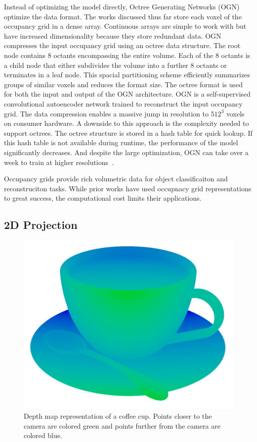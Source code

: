 Instead of optimizing the model directly, Octree Generating Networks (OGN)~\cite{Tatarchenko2017} optimize the data format. The works discussed thus far store each voxel of the occupancy grid in a dense array. Continuous arrays are simple to work with but have increased dimensionality because they store redundant data. OGN compresses the input occupancy grid using an octree data structure. The root node contains 8 octants encompassing the entire volume. Each of the 8 octants is a child node that either subdivides the volume into a further 8 octants or terminates in a leaf node. This spacial partitioning scheme efficiently summarizes groups of similar voxels and reduces the format size. The octree format is used for both the input and output of the OGN architecture. OGN is a self-supervised convolutional autoencoder network trained to reconstruct the input occupancy grid. The data compression enables a massive jump in resolution to $512^3$ voxels on consumer hardware. A downside to this approach is the complexity needed to support octrees. The octree structure is stored in a hash table for quick lookup. If this hash table is not available during runtime, the performance of the model significantly decreases. And despite the large optimization, OGN can take over a week to train at higher resolutions~\cite{Tatarchenko2017}.

Occupancy grids provide rich volumetric data for object classificaiton and reconstruciton tasks. While prior works have used occupnacy grid representations to great success, the computational cost limits their applications.

\newpage


\subsection{2D Projection}

\begin{figure}[ht]
	\centering
	\includegraphics[scale=0.2]{Images/Depth Map Cup}
	\caption{Depth map representation of a coffee cup. Points closer to the camera are colored green and points further from the camera are colored blue.}
	\label{fig:depth_map_cup}
\end{figure}

